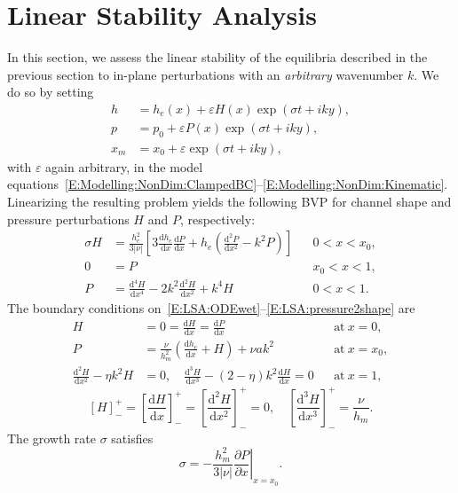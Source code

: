 \documentclass{jfm}
\newcommand{\dd}[2]{\frac{\mathrm{d} #1}{\mathrm{d} #2}}
\newcommand{\ddp}[2]{\frac{\partial #1}{\partial #2}}
\renewcommand{\Pi}{P}
\renewcommand{\Lambda}{H} %
\newcommand{\poisson}{\eta} %
\newcommand{\aspect}{a} %
\begin{document}
\section{Linear Stability Analysis}\label{S:LSA}
In this section, we assess the linear stability of the equilibria described in the previous section to in-plane perturbations with an \textit{arbitrary} wavenumber $k$. We do so by setting
\begin{align}
h &= h_e(x) + \varepsilon \Lambda(x)\exp(\sigma t + i k y),\label{E:LSA:Perturbation1} \\
 p &= p_0 + \varepsilon \Pi(x)\exp(\sigma t + i k y),\\ x_m  &= x_0 +  \varepsilon \exp(\sigma t + i k y),\label{E:LSA:Perturbation3}
\end{align}
with $\varepsilon$ again arbitrary, in the model equations~\eqref{E:Modelling:NonDim:ClampedBC}--\eqref{E:Modelling:NonDim:Kinematic}. Linearizing the resulting problem yields the following BVP for channel shape and pressure perturbations $\Lambda$ and $\Pi$, respectively:
\begin{align}
\sigma \Lambda &=  \frac{h_e^2}{3|\nu|}\left[3\dd{h_e}{x} \dd{\Pi}{x} + h_e\left(\dd{^2 \Pi}{x^2} - k^2 \Pi\right)\right] & &0 < x < x_0,\label{E:LSA:ODEwet}\\
0 &= \Pi & &x_0 < x < 1,\label{E:LSA:ODEdry}\\
\Pi &= \dd{^4 \Lambda}{x^4} - 2k^2 \dd{^2 \Lambda}{x^2} + k^4 \Lambda & & 0 < x <1.\label{E:LSA:pressure2shape}
\end{align}
The boundary conditions on~\eqref{E:LSA:ODEwet}--\eqref{E:LSA:pressure2shape} are
\begin{align}
\Lambda &= 0 = \dd{\Lambda}{x} = \dd{\Pi}{x} & &\text{at}~x = 0,\label{E:LSA:BC_at_0}\\
\Pi &= \frac{\nu}{h_m^2}\left(\dd{h_e}{x} + \Lambda\right) + \nu \aspect k^2 & &\text{at}~x = x_0,\label{E:LSA:pressure_bc}\\
\dd{^2 \Lambda}{x^2} - \poisson k^2
\Lambda & = 0, \quad  \dd{^3 \Lambda}{x^3} - (2-\poisson)k^2 \dd{\Lambda}{x} = 0 & &\text{at}~x = 1,\label{E:LSA:BC_at_1}
\end{align}
\begin{equation}\label{E:LSA:jump_conds}
\left[\Lambda\right]_-^+= \left[\dd{\Lambda}{x}\right]_-^+ = \left[\dd{^2\Lambda}{x^2}\right]_-^+= 0, \quad\left[\dd{^3 \Lambda}{x^3}\right]_-^+ = \frac{\nu}{h_m }.
\end{equation}
The growth rate $\sigma$ satisfies
\begin{equation}\label{E:LSA:kinematic}
\sigma = -\frac{h_m^2}{3|\nu|}\left.\ddp{\Pi}{x}\right|_{x = x_0}.
\end{equation}
\end{document}
